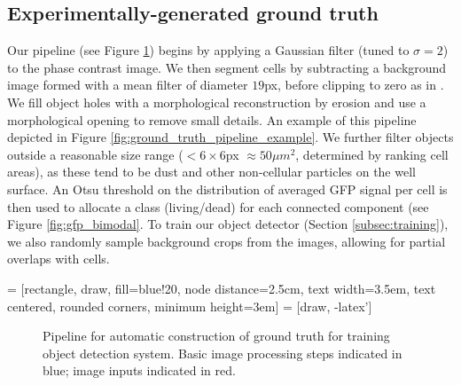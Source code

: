 \subsection{Experimentally-generated ground truth}
\label{subsec:data}

Our pipeline (see Figure \ref{fig:pipeline_ground_truth}) begins by applying a Gaussian filter (tuned to $\sigma = 2$) to the phase contrast image. We then segment cells by subtracting a background image formed with a mean filter of diameter $19$px, before clipping to zero as in \cite{walter2010automatic}. We fill object holes with a morphological reconstruction by erosion and use a morphological opening to remove small details. An example of this pipeline depicted in Figure \ref{fig:ground_truth_pipeline_example}. We further filter objects outside a reasonable size range ($< 6 \times 6$px $\approx 50 \mu m^2$, determined by ranking cell areas), as these tend to be dust and other non-cellular particles on the well surface. An Otsu threshold on the distribution of averaged GFP signal per cell is then used to allocate a class (living/dead) for each connected component (see Figure \ref{fig:gfp_bimodal}. To train our object detector (Section \ref{subsec:training}), we also randomly sample background crops from the images, allowing for partial overlaps with cells.

 = [rectangle, draw, fill=blue!20, node distance=2.5cm,
    text width=3.5em, text centered, rounded corners, minimum height=3em]
 = [draw, -latex']

\begin{figure}
\centering
{}
\caption{Pipeline for automatic construction of ground truth for training object detection system. Basic image processing steps indicated in blue; image inputs indicated in red.}
\label{fig:pipeline_ground_truth}
\end{figure}


